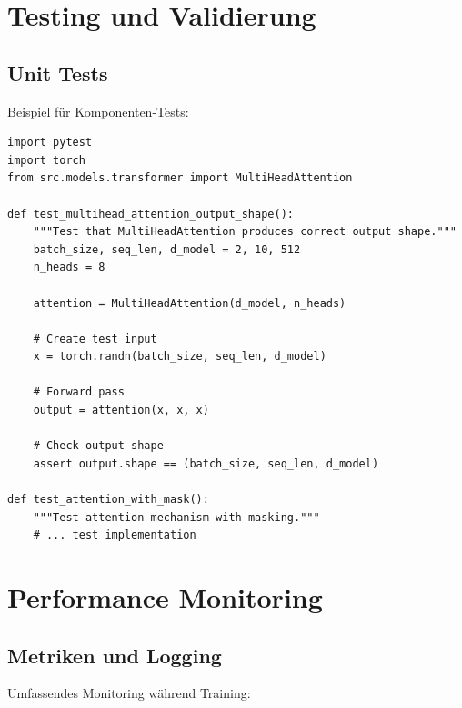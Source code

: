 \section{Testing und Validierung}

\subsection{Unit Tests}

Beispiel für Komponenten-Tests:

\begin{lstlisting}[style=pythonstyle, caption=Unit Test Example]
import pytest
import torch
from src.models.transformer import MultiHeadAttention

def test_multihead_attention_output_shape():
    """Test that MultiHeadAttention produces correct output shape."""
    batch_size, seq_len, d_model = 2, 10, 512
    n_heads = 8
    
    attention = MultiHeadAttention(d_model, n_heads)
    
    # Create test input
    x = torch.randn(batch_size, seq_len, d_model)
    
    # Forward pass
    output = attention(x, x, x)
    
    # Check output shape
    assert output.shape == (batch_size, seq_len, d_model)

def test_attention_with_mask():
    """Test attention mechanism with masking."""
    # ... test implementation
\end{lstlisting}

\section{Performance Monitoring}

\subsection{Metriken und Logging}

Umfassendes Monitoring während Training:

